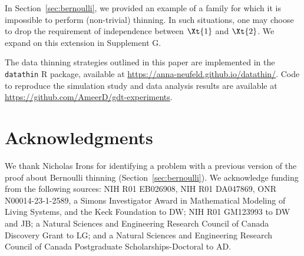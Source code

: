 \documentclass[12pt]{article}
\begin{document}
In Section~\ref{sec:bernoulli}, we provided an example of a family for which it is impossible to perform (non-trivial) thinning.  In such situations, one may choose to drop the requirement of independence between $\Xt{1}$ and $\Xt{2}$. We expand on this extension in Supplement G.

The data thinning strategies outlined in this paper are implemented in the \texttt{datathin} R package, available at \url{https://anna-neufeld.github.io/datathin/}. Code to reproduce the simulation study and data analysis results are available at \url{https://github.com/AmeerD/gdt-experiments}.


\section*{Acknowledgments}

We thank Nicholas Irons for identifying a problem with a previous version of the proof about Bernoulli thinning
(Section~\ref{sec:bernoulli}).   
We acknowledge funding from  the following sources: 
NIH R01 EB026908, NIH R01 DA047869, ONR N00014-23-1-2589, a Simons Investigator Award in Mathematical Modeling of Living Systems, and the Keck Foundation to DW; NIH R01 GM123993 to DW and JB; a Natural Sciences and Engineering Research Council of Canada Discovery Grant to LG; and a Natural Sciences and Engineering Research Council of Canada Postgraduate Scholarships-Doctoral to AD. 


\newpage




\newpage 
\end{document}
